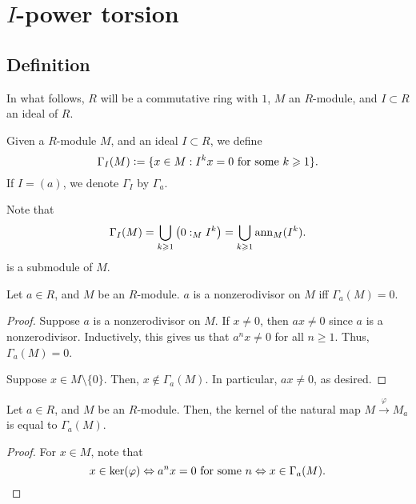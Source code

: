 \section{\texorpdfstring{$I$}{I}-power torsion}

\subsection{Definition}

In what follows, $R$ will be a commutative ring with $1$, $M$ an $R$-module, and $I \subset R$ an ideal of $R$.

\begin{defn}
	Given a $R$-module $M$, and an ideal $I \subset R$, we define
	\begin{equation*} 
		\Gamma_{I}(M) \vcentcolon= \{x \in M : I^{k} x = 0 \text{ for some } k \ge 1\}.
	\end{equation*}
	If $I = (a)$, we denote $\Gamma_{I}$ by $\Gamma_{a}$.
\end{defn}

\begin{rem}
	Note that
	\begin{equation*} 
		\Gamma_{I}(M) = \bigcup_{k \ge 1} \left(0 :_{M} I^{k}\right) = \bigcup_{k \ge 1} \ann_{M}(I^{k}).
	\end{equation*}
	is a submodule of $M$. 
\end{rem}

\begin{prop}
	Let $a \in R$, and $M$ be an $R$-module. $a$ is a nonzerodivisor on $M$ iff $\Gamma_{a}(M) = 0$.
\end{prop}
\begin{proof} 
	\forward Suppose $a$ is a nonzerodivisor on $M$. If $x \neq 0$, then $ax \neq 0$ since $a$ is a nonzerodivisor. Inductively, this gives us that $a^{n} x \neq 0$ for all $n \ge 1$. Thus, $\Gamma_{a}(M) = 0$.

	\backward Suppose $x \in M \setminus \{0\}$. Then, $x \notin \Gamma_{a}(M)$. In particular, $ax \neq 0$, as desired.
\end{proof}

\begin{prop} \label{prop:cech-zeroth-cohomology}
	Let $a \in R$, and $M$ be an $R$-module. Then, the kernel of the natural map $M \xrightarrow{\varphi} M_{a}$ is equal to $\Gamma_{a}(M)$.
\end{prop}
\begin{proof} 
	For $x \in M$, note that
	\begin{equation*} 
		x \in \ker(\varphi) \Leftrightarrow a^{n} x = 0 \text{ for some } n  \Leftrightarrow x \in \Gamma_{a}(M). \qedhere
	\end{equation*}
\end{proof}

